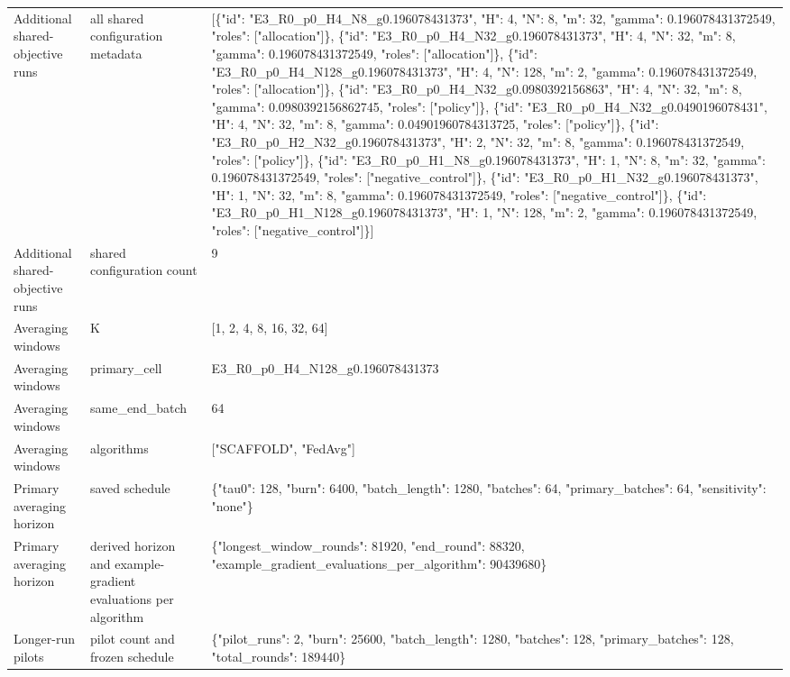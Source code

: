 \begin{tabular}{lll}
Additional shared-objective runs & all shared configuration metadata & [\{"id": "E3\_R0\_p0\_H4\_N8\_g0.196078431373", "H": 4, "N": 8, "m": 32, "gamma": 0.196078431372549, "roles": ["allocation"]\}, \{"id": "E3\_R0\_p0\_H4\_N32\_g0.196078431373", "H": 4, "N": 32, "m": 8, "gamma": 0.196078431372549, "roles": ["allocation"]\}, \{"id": "E3\_R0\_p0\_H4\_N128\_g0.196078431373", "H": 4, "N": 128, "m": 2, "gamma": 0.196078431372549, "roles": ["allocation"]\}, \{"id": "E3\_R0\_p0\_H4\_N32\_g0.0980392156863", "H": 4, "N": 32, "m": 8, "gamma": 0.0980392156862745, "roles": ["policy"]\}, \{"id": "E3\_R0\_p0\_H4\_N32\_g0.0490196078431", "H": 4, "N": 32, "m": 8, "gamma": 0.04901960784313725, "roles": ["policy"]\}, \{"id": "E3\_R0\_p0\_H2\_N32\_g0.196078431373", "H": 2, "N": 32, "m": 8, "gamma": 0.196078431372549, "roles": ["policy"]\}, \{"id": "E3\_R0\_p0\_H1\_N8\_g0.196078431373", "H": 1, "N": 8, "m": 32, "gamma": 0.196078431372549, "roles": ["negative\_control"]\}, \{"id": "E3\_R0\_p0\_H1\_N32\_g0.196078431373", "H": 1, "N": 32, "m": 8, "gamma": 0.196078431372549, "roles": ["negative\_control"]\}, \{"id": "E3\_R0\_p0\_H1\_N128\_g0.196078431373", "H": 1, "N": 128, "m": 2, "gamma": 0.196078431372549, "roles": ["negative\_control"]\}] \\
Additional shared-objective runs & shared configuration count & 9 \\
Averaging windows & K & [1, 2, 4, 8, 16, 32, 64] \\
Averaging windows & primary\_cell & E3\_R0\_p0\_H4\_N128\_g0.196078431373 \\
Averaging windows & same\_end\_batch & 64 \\
Averaging windows & algorithms & ["SCAFFOLD", "FedAvg"] \\
Primary averaging horizon & saved schedule & \{"tau0": 128, "burn": 6400, "batch\_length": 1280, "batches": 64, "primary\_batches": 64, "sensitivity": "none"\} \\
Primary averaging horizon & derived horizon and example-gradient evaluations per algorithm & \{"longest\_window\_rounds": 81920, "end\_round": 88320, "example\_gradient\_evaluations\_per\_algorithm": 90439680\} \\
Longer-run pilots & pilot count and frozen schedule & \{"pilot\_runs": 2, "burn": 25600, "batch\_length": 1280, "batches": 128, "primary\_batches": 128, "total\_rounds": 189440\} \\
\end{tabular}
